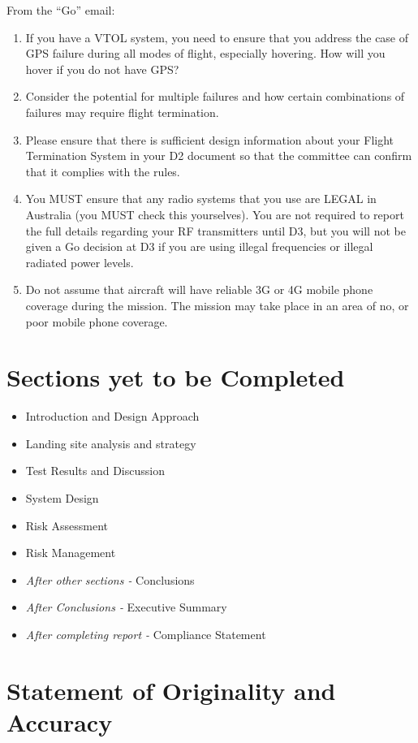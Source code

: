 \documentclass{article}
\begin{document}
From the ``Go'' email:
\begin{enumerate}
	\item If you have a VTOL system, you need to ensure that you address the case of GPS failure during all modes of flight, especially hovering. How will you hover if you do not have GPS?
	\item Consider the potential for multiple failures and how certain combinations of failures may require flight termination.
	\item Please ensure that there is sufficient design information about your Flight Termination System in your D2 document so that the committee can confirm that it complies with the rules.
	\item You MUST ensure that any radio systems that you use are LEGAL in Australia (you MUST check this yourselves). You are not required to report the full details regarding your RF transmitters until D3, but you will not be given a Go decision at D3 if you are using illegal frequencies or illegal radiated power levels.
	\item Do not assume that aircraft will have reliable 3G or 4G mobile phone coverage during the mission. The mission may take place in an area of no, or poor mobile phone coverage.
\end{enumerate}

\section{Sections yet to be Completed}
\begin{itemize}
	\item Introduction and Design Approach
	\item Landing site analysis and strategy
	\item Test Results and Discussion
	\item System Design
	\item Risk Assessment
	\item Risk Management
	\item \textit{After other sections -} Conclusions
	\item \textit{After Conclusions -} Executive Summary
	\item \textit{After completing report -} Compliance Statement
\end{itemize}

\clearpage

\section{Statement of Originality and Accuracy}

\end{document}
